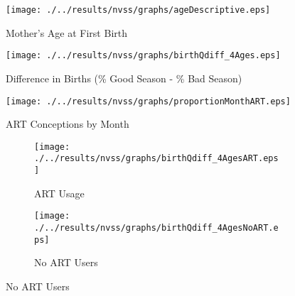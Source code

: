 \begin{figure}[htpb!]
  \begin{center}
  \caption{Mother's Age at First Birth}
  \label{bqFig:NVSSages}
  \texttt{[image: ./../results/nvss/graphs/ageDescriptive.eps]} 
  \end{center}
\end{figure}

\begin{figure}[htpb!]
  \begin{center}
  \caption{Difference in Births (\% Good Season - \% Bad Season)}
  \label{fig:NVSSbirthsAges}
  \texttt{[image: ./../results/nvss/graphs/birthQdiff\_4Ages.eps]}
  \end{center}
\end{figure}

\begin{figure}[htpb!] 
\begin{center}
  \centering  
  \caption{ART Conceptions by Month}
  \texttt{[image: ./../results/nvss/graphs/proportionMonthART.eps]}  
  \label{fig:ARTMonth} 
\end{center}
\end{figure} 

\begin{figure}[htpb!]
\begin{center}
\caption{Difference in Births (\% Good Season - \% Bad Season)}
\label{fig:birthDiffART}
\begin{subfigure}{.5\textwidth}
  \centering
  \texttt{[image: ./../results/nvss/graphs/birthQdiff\_4AgesART.eps]}
  \caption{ART Usage}
  \label{fig:DiffNoART}
\end{subfigure}%
\begin{subfigure}{.5\textwidth}
  \centering
  \texttt{[image: ./../results/nvss/graphs/birthQdiff\_4AgesNoART.eps]}
  \caption{No ART Users}
  \label{fig:DiffART}
\end{subfigure}
\end{center}
\end{figure}

